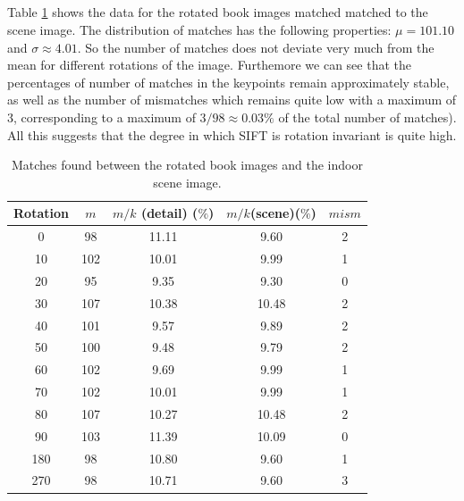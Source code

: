 \documentclass{article}
\begin{document}
\subsection{}
Table \ref{table4} shows the data for the rotated book images matched matched to the scene image. The distribution of matches has the following properties: $\mu = 101.10$ and $\sigma \approx 4.01$. So the number of matches does not deviate very much from the mean for different rotations of the image. Furthemore we can see that the percentages of number of matches in the keypoints remain approximately stable, as well as the number of mismatches which remains quite low with a maximum of 3, corresponding to a maximum of $3/98 \approx 0.03 \% $ of the total number of matches). All this suggests that the degree in which SIFT is rotation invariant is quite high. 

\begin{table}[H]
\centering
 \caption{Matches found between the rotated book images and the indoor scene image.}
 \label{table4}
 \begin{tabular}{|c|c|c|c|c|}
 \hline
  Rotation & $m$ & $m/k$ (detail) ($\%$) & $m/k$(scene)($\%$) & $mism$\\
  \hline
  0 & 98 & 11.11 & 9.60 & 2 \\
  10 & 102 & 10.01 & 9.99 & 1 \\
  20 & 95 & 9.35 & 9.30 & 0 \\
  30 & 107 & 10.38 & 10.48 & 2 \\
  40 & 101 & 9.57 & 9.89 & 2 \\
  50 & 100 & 9.48 & 9.79 & 2 \\
  60 & 102 & 9.69 & 9.99 & 1 \\
  70 & 102 & 10.01 & 9.99 & 1 \\
  80 & 107 & 10.27 & 10.48 & 2 \\
  90 & 103 & 11.39 & 10.09 & 0 \\
  180 & 98 & 10.80 & 9.60 & 1 \\
  270 & 98 & 10.71 & 9.60 & 3 \\
  \hline
 \end{tabular}
\end{table}

\end{document}
